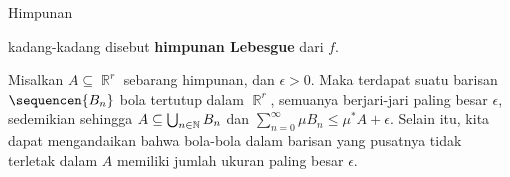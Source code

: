 \medskip 
{} Himpunan 
      
      
\noindent kadang-kadang disebut {\bf himpunan Lebesgue} dari $f$. 
      
 Misalkan $A\subseteq\BbbR^r$ sebarang himpunan, 
dan $\epsilon>0$. Maka terdapat suatu barisan $\sequencen{B_n}$ bola tertutup 
dalam $\BbbR^r$, semuanya berjari-jari paling besar $\epsilon$, sedemikian 
sehingga $A\subseteq\bigcup_{n\in\Bbb N}B_n$ dan 
$\sum_{n=0}^{\infty}\mu B_n\le\mu^*A+\epsilon$. Selain itu, kita dapat 
mengandaikan bahwa bola-bola dalam barisan yang pusatnya tidak terletak dalam 
$A$ memiliki jumlah ukuran paling besar $\epsilon$. 
      
